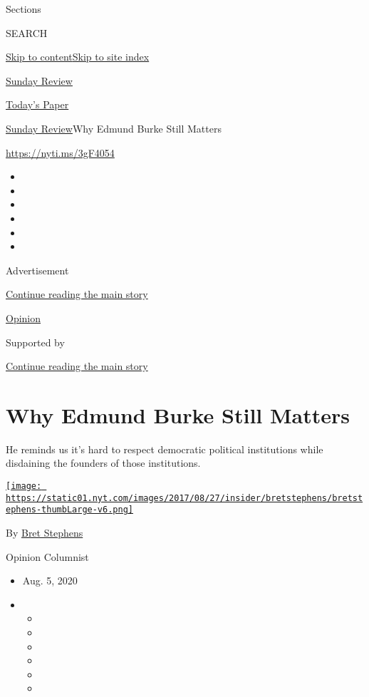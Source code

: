 Sections

SEARCH

\protect\hyperlink{site-content}{Skip to
content}\protect\hyperlink{site-index}{Skip to site index}

\href{https://www.nytimes.com/section/opinion/sunday}{Sunday Review}

\href{https://myaccount.nytimes.com/auth/login?response_type=cookie\&client_id=vi}{}

\href{https://www.nytimes.com/section/todayspaper}{Today's Paper}

\href{/section/opinion/sunday}{Sunday Review}\textbar{}Why Edmund Burke
Still Matters

\href{https://nyti.ms/3gF4054}{https://nyti.ms/3gF4054}

\begin{itemize}
\item
\item
\item
\item
\item
\item
\end{itemize}

Advertisement

\protect\hyperlink{after-top}{Continue reading the main story}

\href{/section/opinion}{Opinion}

Supported by

\protect\hyperlink{after-sponsor}{Continue reading the main story}

\hypertarget{why-edmund-burke-still-matters}{%
\section{Why Edmund Burke Still
Matters}\label{why-edmund-burke-still-matters}}

He reminds us it's hard to respect democratic political institutions
while disdaining the founders of those institutions.

\href{https://www.nytimes.com/by/bret-stephens}{\texttt{[image: https://static01.nyt.com/images/2017/08/27/insider/bretstephens/bretstephens-thumbLarge-v6.png]}}

By \href{https://www.nytimes.com/by/bret-stephens}{Bret Stephens}

Opinion Columnist

\begin{itemize}
\item
  Aug. 5, 2020
\item
  \begin{itemize}
  \item
  \item
  \item
  \item
  \item
  \item
  \end{itemize}
\end{itemize}

